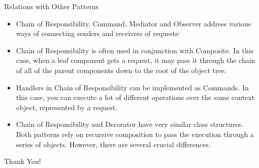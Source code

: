 \documentclass[13pt]{beamer}
\begin{document}
\begin{frame}{Relations with Other Patterns}
	\begin{itemize}
		\setlength\itemsep{1em}
		\item Chain of Responsibility, Command, Mediator and Observer address various ways of connecting senders and receivers of requests:
		\item Chain of Responsibility is often used in conjunction with Composite. In this case, when a leaf component gets a request, it may pass it through the chain of all of the parent components down to the root of the object tree.
		\item Handlers in Chain of Responsibility can be implemented as Commands. In this case, you can execute a lot of different operations over the same context object, represented by a request.
		\item Chain of Responsibility and Decorator have very similar class structures. Both patterns rely on recursive composition to pass the execution through a series of objects. However, there are several crucial differences.
	\end{itemize}
\end{frame}

\begin{frame}
\begin{center}
{\fontsize{40}{50}\selectfont Thank You!}
\end{center}
\end{frame}
\end{document}
